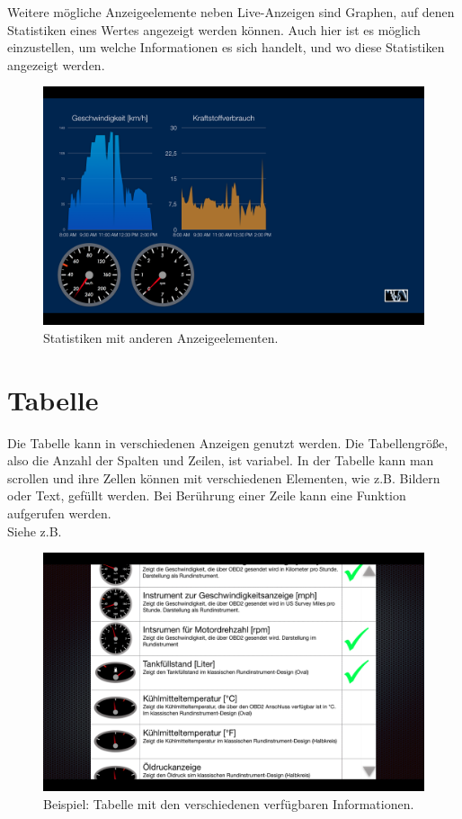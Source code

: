 \documentclass[pflichtenheft.tex]{subfiles}
\begin{document}
Weitere mögliche Anzeigeelemente neben Live-Anzeigen sind Graphen, auf denen Statistiken eines Wertes angezeigt werden können. Auch hier ist es möglich einzustellen, um welche Informationen es sich handelt, und wo diese Statistiken angezeigt werden.
\begin{figure}[H]
  	\begin{center}
 		\includegraphics[width=\textwidth]{Images/GUI-DashStatistic.png}
  		\caption{Statistiken mit anderen Anzeigeelementen.}
  	\end{center}
\end{figure}

\clearpage
\section{Tabelle}

Die Tabelle kann in verschiedenen Anzeigen genutzt werden. Die Tabellengröße, also die Anzahl der Spalten und Zeilen, ist variabel. In der Tabelle kann man scrollen und ihre Zellen können mit verschiedenen Elementen, wie z.B. Bildern oder Text, gefüllt werden. Bei Berührung einer Zeile kann eine Funktion aufgerufen werden.\\
Siehe z.B. ~

\begin{figure}[H]
  	\begin{center}
 		\includegraphics[width=\textwidth]{Images/GUI-Table.png}
  		\caption{Beispiel: Tabelle mit den verschiedenen verfügbaren Informationen.}
  	\end{center}
\end{figure}
\end{document}
